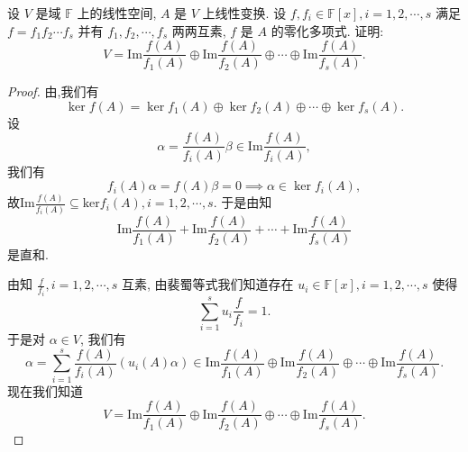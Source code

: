 \documentclass[../../main.tex]{subfiles}
\begin{document}
\begin{example}
设 $V$ 是域 $\mathbb{F}$ 上的线性空间, $A$ 是 $V$ 上线性变换. 设 $f, f_i \in \mathbb{F}[x], i = 1, 2, \cdots, s$ 满足 $f = f_1f_2\cdots f_s$ 并有 $f_1, f_2, \cdots, f_s$ 两两互素, $f$ 是 $A$ 的零化多项式. 证明:
$$
V = \mathrm{Im} \frac{f(A)}{f_1(A)} \oplus \mathrm{Im} \frac{f(A)}{f_2(A)} \oplus \cdots \oplus \mathrm{Im} \frac{f(A)}{f_s(A)}.
$$
\end{example}
\begin{proof}
由,我们有
$$
\ker f(A) = \ker f_1(A) \oplus \ker f_2(A) \oplus \cdots \oplus \ker f_s(A).
$$
设
$$
\alpha = \frac{f(A)}{f_i(A)} \beta \in \mathrm{Im} \frac{f(A)}{f_i(A)},
$$
我们有
$$
f_i(A) \alpha = f(A) \beta = 0 \implies \alpha \in \ker f_i(A),
$$
故$\mathrm{Im}\frac{f\left( A \right)}{f_i\left( A \right)}\subseteq \mathrm{ker}f_i\left( A \right) ,i=1,2,\cdots ,s.$
于是由知
$$
\mathrm{Im} \frac{f(A)}{f_1(A)} + \mathrm{Im} \frac{f(A)}{f_2(A)} + \cdots + \mathrm{Im} \frac{f(A)}{f_s(A)}
$$
是直和.

由知 $\frac{f}{f_i}, i = 1, 2, \cdots, s$ 互素, 由裴蜀等式我们知道存在 $u_i \in \mathbb{F}[x], i = 1, 2, \cdots, s$ 使得
$$
\sum_{i=1}^s u_i \frac{f}{f_i} = 1.
$$
于是对 $\alpha \in V$, 我们有
$$
\alpha = \sum_{i=1}^s \frac{f(A)}{f_i(A)} (u_i(A) \alpha) \in \mathrm{Im} \frac{f(A)}{f_1(A)} \oplus \mathrm{Im} \frac{f(A)}{f_2(A)} \oplus \cdots \oplus \mathrm{Im} \frac{f(A)}{f_s(A)}.
$$
现在我们知道
$$
V = \mathrm{Im} \frac{f(A)}{f_1(A)} \oplus \mathrm{Im} \frac{f(A)}{f_2(A)} \oplus \cdots \oplus \mathrm{Im} \frac{f(A)}{f_s(A)}.
$$

\end{proof}
\end{document}
